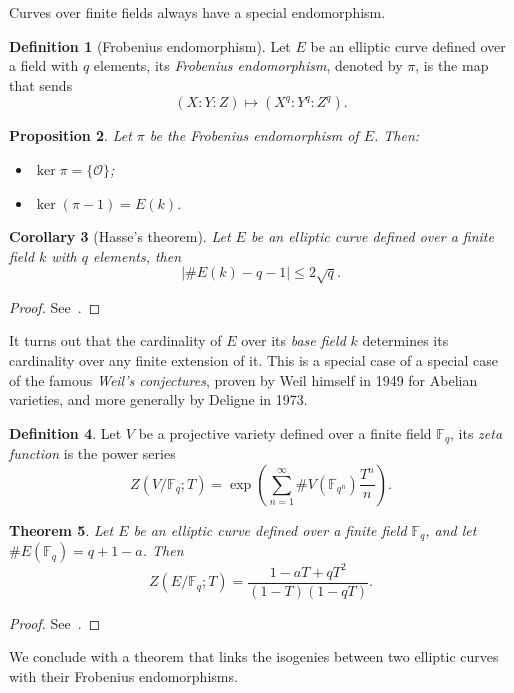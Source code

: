 \documentclass[10pt]{article}
\theoremstyle{plain}
\newtheorem{theorem}{Theorem}
\newtheorem{corollary}[theorem]{Corollary}
\newtheorem{proposition}[theorem]{Proposition}
\theoremstyle{definition}
\newtheorem{definition}[theorem]{Definition}
\def\F{\ensuremath{\mathbb{F}}}
\def\O{\ensuremath{\mathcal{O}}}
\begin{document}
Curves over finite fields always have a special endomorphism.

\begin{definition}[Frobenius endomorphism]
  Let $E$ be an elliptic curve defined over a field with $q$ elements,
  its \emph{Frobenius endomorphism}, denoted by $π$, is the map that
  sends
  \[(X:Y:Z) \mapsto (X^q:Y^q:Z^q).\]
\end{definition}

\begin{proposition}
  \label{th:frob}
  Let $π$ be the Frobenius endomorphism of $E$. Then:
  \begin{itemize}
  \item $\ker π = \{\O\}$;
  \item $\ker (π-1) = E(k)$.
  \end{itemize}
\end{proposition}

\begin{corollary}[Hasse's theorem]
  Let $E$ be an elliptic curve defined over a finite field $k$ with $q$
  elements, then
  \[|\#E(k) - q - 1| ≤ 2\sqrt{q}.\]
\end{corollary}
\begin{proof}
  See~\cite[V, Th.~1.1]{silverman:elliptic}.
\end{proof}

It turns out that the cardinality of $E$ over its \emph{base field}
$k$ determines its cardinality over any finite extension of it. %
This is a special case of a special case of the famous \emph{Weil's
  conjectures}, proven by Weil himself in 1949 for Abelian varieties,
and more generally by Deligne in 1973.

\begin{definition}
  Let $V$ be a projective variety defined over a finite field $\F_q$,
  its \emph{zeta function} is the power series
  \[Z(V/\F_q; T) = \exp\left(\sum_{n=1}^∞\#V(\F_{q^n})\frac{T^n}{n}\right).\]
\end{definition}

\begin{theorem}
  \label{th:weil}
  Let $E$ be an elliptic curve defined over a finite field
  $\F_q$, and let $\#E(\F_q)=q+1-a$. Then
  \[Z(E/\F_q;T) = \frac{1-aT+qT^2}{(1-T)(1-qT)}.\]
\end{theorem}
\begin{proof}
  See~\cite[V, Th.~2.4]{silverman:elliptic}.
\end{proof}

We conclude with a theorem that links the isogenies between two
elliptic curves with their Frobenius endomorphisms.
\end{document}
